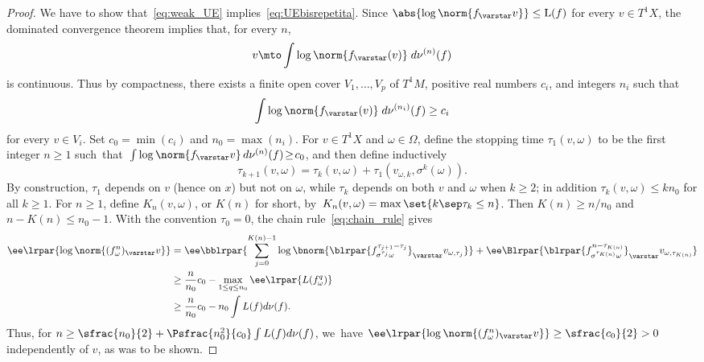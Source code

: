 \begin{proof} We have to show that~\eqref{eq:weak_UE} implies~\eqref{eq:UEbisrepetita}.
Since $\abs{\log \norm{f_{\varstar}v}} \leq \mathrm L(f)$ for every $v\in T^1X$, the
dominated convergence theorem implies that, for every $n$,
\begin{equation*}
v\mto \int \log \norm {f_{\varstar}( v)} \; d\nu^{(n)}(f)
\end{equation*}
is continuous.
Thus by compactness, there exists a finite open cover $V_1, \ldots, V_p$ of $T^1M$, positive
real numbers $c_i$, and integers
$n_i$ such that
\begin{equation*}
\int \log \norm{f_\varstar ( v) } \; d\nu^{(n_i)}(f) \geq c_i
\end{equation*}
for every
$ v\!\in\! V_i$.
Set $c_0 \!=\! \min(c_i)$ and $n_0 \!=\! \max(n_i)$. For $ v\in T^1X$ and
$\omega\in \Omega$, define the stopping time $\tau_1( v, \omega)$ to
be the first integer $n\!\geq\! 1$ such~that~\hbox{$\int \log \norm{f_\varstar v } \, d\nu^{(n)}(f) \!\geq\! c_0$}, and then define inductively
\begin{equation*}
\tau_{k+1}( v, \omega) = \tau_k( v, \omega) + \tau_1( v_{\omega, k}, \sigma^k (\omega)).
\end{equation*}
By construction, $\tau_1$ depends on $v$ (hence on $x$) but not on $\omega$,
while $\tau_k$ depends on both $v$ and $\omega$ when $k\geq 2$; in addition
$\tau_k(v,\omega)\leq k n_0$ for all $k\geq 1$. For $n\geq 1$, define
$K_n( v,\omega)$, or $K(n)$ for short, by~$K_n( v,\omega)=\max\set{k \sep \tau_k \leq n}$. Then
$K(n) \geq n/n_0$ and $n- K(n)\leq n_0-1$.
With the convention $\tau_0 = 0$, the chain rule~\eqref{eq:chain_rule} gives
\begin{align*}\label{eq:stopping_bdd}
\notag\ee\lrpar{\log\norm{(f^n_\omega)_\varstar v}} &= \ee\bblrpar{\sum_{j = 0}^{K(n) -1} \log\bnorm{\blrpar{f_{\sigma^{\tau_j}\omega}^{\tau_{j+1} - \tau_j} }_\varstar v_{\omega, \tau_j}}} +
\ee\Blrpar{ \blrpar{f_{\sigma^{\tau_{K(n)}}\omega}^{n- \tau_{K(n)}} }_\varstar v_{\omega, \tau_{K(n)}}} \\
&\geq \frac{n}{n_0}c_0 - \max_{1\leq q\leq n_0} \ee\lrpar{ L (f_\omega^q) } \\
&\geq \frac{n}{n_0}c_0 - n_0 \int L(f)d\nu(f).
\end{align*}
Thus, for $n\geq \sfrac{n_0}{2} + \Psfrac{n_0^2}{c_0}\int L(f)d\nu(f)$, we~have $\ee\lrpar{\log\norm{(f^n_\omega)_\varstar v}} \geq \sfrac{c_0}{2}>0$ independently of $ v$, as was to be shown.
\end{proof}


